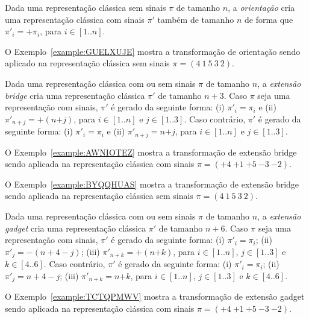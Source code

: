 

\begin{definition}
Dada uma representação clássica sem sinais $\pi$ de tamanho $n$, a \emph{orientação} cria uma representação clássica com sinais $\pi'$ também de tamanho $n$ de forma que $\pi'_{i} = +\pi_i$, para $i \in [1..n]$.
\end{definition}

O Exemplo~\ref{example:GUELXUJE} mostra a transformação de orientação sendo aplicado na representação clássica sem sinais $\pi=(4~1~5~3~2)$.



\begin{definition}
Dada uma representação clássica com ou sem sinais $\pi$ de tamanho $n$, a \emph{extensão bridge} cria uma representação clássica $\pi'$ de tamanho $n + 3$. Caso $\pi$ seja uma representação com sinais, $\pi'$ é gerado da seguinte forma: (i) $\pi'_{i} = \pi_i$ e (ii) $\pi'_{n+j} = +(n{+j})$, para $i \in [1..n]$ e $j \in [1..3]$. Caso contrário, $\pi'$ é gerado da seguinte forma: (i) $\pi'_{i} = \pi_i$ e (ii) $\pi'_{n+j} = n{+j}$, para $i \in [1..n]$ e $j \in [1..3]$.
\end{definition}

O Exemplo~\ref{example:AWNIOTEZ} mostra a transformação de extensão bridge sendo aplicada na representação clássica com sinais $\pi=({+4}~{+1}~{+5}~{-3}~{-2})$.



O Exemplo~\ref{example:BYQQHUAS} mostra a transformação de extensão bridge sendo aplicada na representação clássica sem sinais $\pi=(4~1~5~3~2)$.



\begin{definition}
Dada uma representação clássica com ou sem sinais $\pi$ de tamanho $n$, a \emph{extensão gadget} cria uma representação clássica $\pi'$ de tamanho $n + 6$. Caso $\pi$ seja uma representação com sinais, $\pi'$ é gerado da seguinte forma: (i) $\pi'_{i} = \pi_i$; (ii) $\pi'_j = -(n+4-j)$; (iii) $\pi'_{n+k} = +(n{+k})$, para $i \in [1..n]$, $j \in [1..3]$ e $k \in [4..6]$. Caso contrário, $\pi'$ é gerado da seguinte forma: (i) $\pi'_{i} = \pi_i$; (ii) $\pi'_j = n+4-j$; (iii) $\pi'_{n+k} = n{+k}$, para $i \in [1..n]$, $j \in [1..3]$ e $k \in [4..6]$.
\end{definition}

O Exemplo~\ref{example:TCTQPMWV} mostra a transformação de extensão gadget sendo aplicada na representação clássica com sinais $\pi=({+4}~{+1}~{+5}~{-3}~{-2})$.

